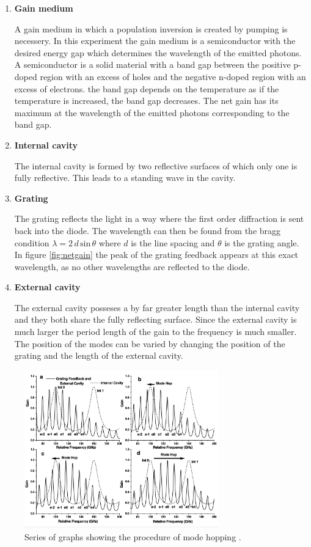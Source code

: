 \begin{enumerate}
\item \textbf{Gain medium}

\noindent
A gain medium in which a population inversion is created by pumping is necessery.
In this experiment the gain medium is a semiconductor with the desired energy gap which determines the wavelength of the emitted photons.
A semiconductor is a solid material with a band gap between the positive p-doped region with an excess of holes and the negative n-doped region with an excess of electrons.
the band gap depends on the temperature as if the temperature is increased, the band gap decreases.
The net gain has its maximum at the wavelength of the emitted photons corresponding to the band gap.

\item \textbf{Internal cavity}

\noindent
The internal cavity is formed by two reflective surfaces of which only one is fully reflective.
This leads to a standing wave in the cavity.

\item \textbf{Grating}

\noindent
The grating reflects the light in a way where the first order diffraction is sent back into the diode.
The wavelength can then be found from the bragg condition $\lambda = 2 \, d \, \text{sin}\, \theta$ where $d$ is the line spacing and $\theta$ is the grating angle.
In figure \ref{fig:netgain} the peak of the grating feedback appears at this exact wavelength, as no other wavelengths are reflected to the diode.

\item \textbf{External cavity}

\noindent
The external cavity posseses a by far greater length than the internal cavity and they both share the fully reflecting surface.
Since the external cavity is much larger the period length of the gain to the frequency is much smaller.
The position of the modes can be varied by changing the position of the grating and the length of the external cavity.

\end{enumerate}

\noindent

\begin{figure}
    \centering
    \includegraphics[width=0.75\textwidth]{modehops.png}
    \caption{Series of graphs showing the procedure of mode hopping \cite{V60}.}
    \label{fig:modehops}
  \end{figure}
